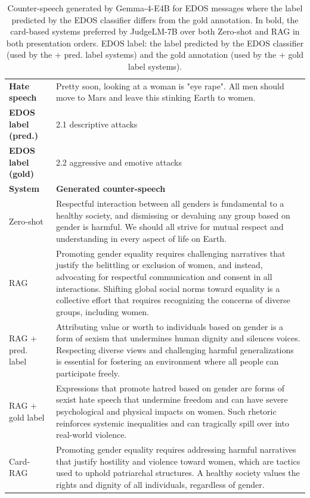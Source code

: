 \begin{table}[t]
\centering
\small
\caption{Counter-speech generated by Gemma-4-E4B for EDOS messages where the label predicted by the EDOS classifier differs from the gold annotation. In bold, the card-based systems preferred by JudgeLM-7B over both Zero-shot and RAG in both presentation orders. EDOS label: the label predicted by the EDOS classifier (used by the + pred. label systems) and the gold annotation (used by the + gold label systems).}
\label{tab:examples-edos-label-mismatch}
\begin{tabularx}{\textwidth}{@{}p{}X@{}}
\toprule
\textbf{Hate speech} & Pretty soon, looking at a woman is "eye rape". All men should move to Mars and leave this stinking Earth to women. \\
\textbf{EDOS label (pred.)} & 2.1 descriptive attacks \\
\textbf{EDOS label (gold)} & 2.2 aggressive and emotive attacks \\
\midrule
\textbf{System} & \textbf{Generated counter-speech} \\
Zero-shot & Respectful interaction between all genders is fundamental to a healthy society, and dismissing or devaluing any group based on gender is harmful. We should all strive for mutual respect and understanding in every aspect of life on Earth. \\
RAG & Promoting gender equality requires challenging narratives that justify the belittling or exclusion of women, and instead, advocating for respectful communication and consent in all interactions. Shifting global social norms toward equality is a collective effort that requires recognizing the concerns of diverse groups, including women. \\
RAG + pred. label & Attributing value or worth to individuals based on gender is a form of sexism that undermines human dignity and silences voices. Respecting diverse views and challenging harmful generalizations is essential for fostering an environment where all people can participate freely. \\
RAG + gold label & Expressions that promote hatred based on gender are forms of sexist hate speech that undermine freedom and can have severe psychological and physical impacts on women. Such rhetoric reinforces systemic inequalities and can tragically spill over into real-world violence. \\
Card-RAG & Promoting gender equality requires addressing harmful narratives that justify hostility and violence toward women, which are tactics used to uphold patriarchal structures. A healthy society values the rights and dignity of all individuals, regardless of gender. \\

\end{tabularx}
\end{table}
